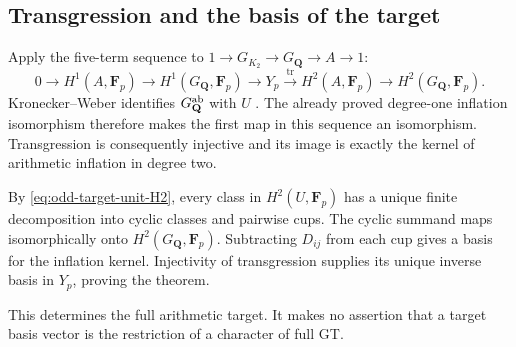 \subsection{Transgression and the basis of the target}

Apply the five-term sequence to
\(1\to G_{K_2}\to G_{\mathbf Q}\to A\to1\):
\[
 0\to H^1(A,\mathbf F_p)\to H^1(G_{\mathbf Q},\mathbf F_p)
       \to Y_p\xrightarrow{\ \operatorname{tr}\ }
           H^2(A,\mathbf F_p)\to H^2(G_{\mathbf Q},\mathbf F_p).
\]
Kronecker--Weber identifies
\(G_{\mathbf Q}^{\rm ab}\) with \(U\)
\cite[I, Theorem~4.16, pp.~49--50]{MilneCFT}.
The already proved degree-one inflation isomorphism
therefore makes the first map in this sequence
an isomorphism.  Transgression is consequently
injective and its image is exactly the kernel
of arithmetic inflation in degree two.

By \eqref{eq:odd-target-unit-H2}, every class in
\(H^2(U,\mathbf F_p)\) has a unique finite
decomposition into cyclic classes and pairwise
cups.  The cyclic summand maps isomorphically
onto \(H^2(G_{\mathbf Q},\mathbf F_p)\).
Subtracting \(D_{ij}\) from each cup gives
a basis for the inflation kernel.  Injectivity
of transgression supplies its unique inverse
basis in \(Y_p\), proving the theorem.

This determines the full arithmetic target.
It makes no assertion that a target basis vector
is the restriction of a character of full GT.
